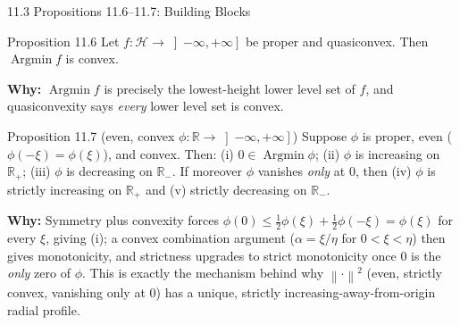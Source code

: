 \documentclass[aspectratio=169,10pt]{beamer}
\newcommand{\mHH}{\mathcal H}
\newcommand{\norm}[1]{\left\|#1\right\|}
\newcommand{\R}{\mathbb{R}}
\newcommand{\Rp}{\mathbb{R}_{+}}
\newcommand{\Argmin}{\operatorname{Argmin}}
\begin{document}
\begin{frame}{11.3 Propositions 11.6--11.7: Building Blocks}

  \begin{block}{Proposition 11.6}
    Let $f:\mHH\to\left]-\infty,+\infty\right]$ be proper and
    quasiconvex. Then $\Argmin f$ is convex.
  \end{block}
  \textbf{Why:} $\Argmin f$ is precisely the lowest-height lower
  level set of $f$, and quasiconvexity says \emph{every} lower level
  set is convex.

  \begin{block}{Proposition 11.7 (even, convex $\phi:\R\to\left]-\infty,+\infty\right]$)}
    Suppose $\phi$ is proper, even ($\phi(-\xi)=\phi(\xi)$), and
    convex. Then: (i) $0\in\Argmin\phi$; (ii) $\phi$ is increasing on
    $\Rp$; (iii) $\phi$ is decreasing on $\R_-$. If moreover $\phi$
    vanishes \emph{only} at $0$, then (iv) $\phi$ is strictly
    increasing on $\Rp$ and (v) strictly decreasing on $\R_-$.
  \end{block}

  \textbf{Why:} Symmetry plus convexity forces $\phi(0)\le\tfrac12\phi(\xi)+\tfrac12\phi(-\xi)=\phi(\xi)$
  for every $\xi$, giving (i); a convex combination argument
  ($\alpha=\xi/\eta$ for $0<\xi<\eta$) then gives monotonicity, and
  strictness upgrades to strict monotonicity once $0$ is the
  \emph{only} zero of $\phi$. This is exactly the mechanism behind
  why $\norm{\cdot}^2$ (even, strictly convex, vanishing only at $0$)
  has a unique, strictly increasing-away-from-origin radial profile.

\end{frame}
\end{document}
